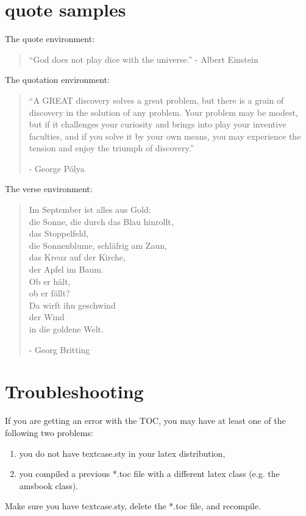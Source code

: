 \section{quote samples}
The quote environment:
\begin{quote}
``God does not play dice with the universe.'' - Albert Einstein
\end{quote}
The quotation environment:
\begin{quotation}
 ``A GREAT discovery solves a great problem, but there is a grain of discovery in the solution of any problem.
 Your problem may be modest, but if it challenges your curiosity and brings into play your inventive faculties,
 and if you solve it by your own means, you may experience the tension and enjoy the triumph of discovery.''
 
 - George P\'olya
\end{quotation}
The verse environment:
\begin{verse}
Im September ist alles aus Gold:\\ 
die Sonne, die durch das Blau hinrollt,\\
das Stoppelfeld,\\
die Sonnenblume, schläfrig am Zaun,\\
das Kreuz auf der Kirche,\\
der Apfel im Baum.\\
Ob er h\"alt,\\
ob er f\"allt? \\
Da wirft ihn geschwind\\
der Wind\\
in die goldene Welt.

- Georg Britting
\end{verse}

\section{Troubleshooting}

If you are getting an error with the TOC, you may have at least one of the following two problems:
\begin{enumerate}
 \item you do not have textcase.sty in your latex distribution,
 \item you compiled a previous *.toc file with a different latex class (e.g. the amsbook class).
\end{enumerate}
Make sure you have textcase.sty, delete the *.toc file, and recompile.
